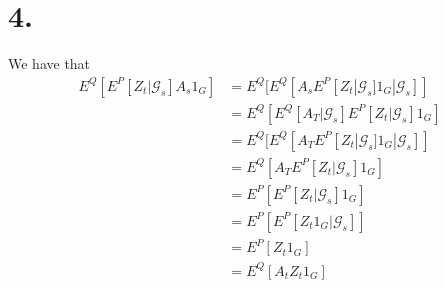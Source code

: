 \documentclass[11pt]{article}
\begin{document}
\section*{4.}
We have that 
\begin{align*}
    E^Q[E^P[Z_t | \mathcal{G}_s] A_s 1_G] 
    &= E^Q[E^Q[A_sE^P[Z_t | \mathcal{G}_s] 1_G |\mathcal{G}_s]] \\
    &= E^Q[E^Q[A_T|\mathcal{G}_s]E^P[Z_t|\mathcal{G}_s]1_G] \\
    &= E^Q[E^Q[A_TE^P[Z_t|\mathcal{G}_s]1_G|\mathcal{G}_s]] \\
    &= E^Q[A_TE^P[Z_t|\mathcal{G}_s] 1_G] \\
    &= E^P[E^P[Z_t|\mathcal{G}_s] 1_G] \\
    &= E^P[E^P[Z_t 1_G | \mathcal{G}_s]] \\
    &= E^P[Z_t 1_G] \\
    &= E^Q[A_t Z_t 1_G]
\end{align*}
\end{document}
